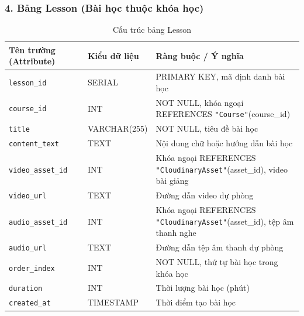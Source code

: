 \documentclass[../DoAn.tex]{subfiles}
\begin{document}
\subsubsection*{4. Bảng Lesson (Bài học thuộc khóa học)}
\begin{table}[H]
\centering
\footnotesize
\renewcommand{\arraystretch}{1.2}
\begin{tabular}{|p{4.2cm}|p{3.2cm}|p{7.1cm}|}
\hline
\textbf{Tên trường (Attribute)} & \textbf{Kiểu dữ liệu} & \textbf{Ràng buộc / Ý nghĩa} \\
\hline
\texttt{lesson\_id} & SERIAL & PRIMARY KEY, mã định danh bài học \\
\hline
\texttt{course\_id} & INT & NOT NULL, khóa ngoại REFERENCES \texttt{"Course"}(course\_id) \\
\hline
\texttt{title} & VARCHAR(255) & NOT NULL, tiêu đề bài học \\
\hline
\texttt{content\_text} & TEXT & Nội dung chữ hoặc hướng dẫn bài học \\
\hline
\texttt{video\_asset\_id} & INT & Khóa ngoại REFERENCES \texttt{"CloudinaryAsset"}(asset\_id), video bài giảng \\
\hline
\texttt{video\_url} & TEXT & Đường dẫn video dự phòng \\
\hline
\texttt{audio\_asset\_id} & INT & Khóa ngoại REFERENCES \texttt{"CloudinaryAsset"}(asset\_id), tệp âm thanh nghe \\
\hline
\texttt{audio\_url} & TEXT & Đường dẫn tệp âm thanh dự phòng \\
\hline
\texttt{order\_index} & INT & NOT NULL, thứ tự bài học trong khóa học \\
\hline
\texttt{duration} & INT & Thời lượng bài học (phút) \\
\hline
\texttt{created\_at} & TIMESTAMP & Thời điểm tạo bài học \\
\hline
\end{tabular}
\caption{Cấu trúc bảng Lesson}
\label{tab:schema_lesson}
\end{table}
\end{document}
